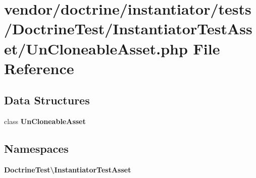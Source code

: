 \section{vendor/doctrine/instantiator/tests/\+Doctrine\+Test/\+Instantiator\+Test\+Asset/\+Un\+Cloneable\+Asset.php File Reference}
\label{_un_cloneable_asset_8php}
\subsection*{Data Structures}
\begin{DoxyCompactItemize}
\item 
class {\bf Un\+Cloneable\+Asset}
\end{DoxyCompactItemize}
\subsection*{Namespaces}
\begin{DoxyCompactItemize}
\item 
 {\bf Doctrine\+Test\textbackslash{}\+Instantiator\+Test\+Asset}
\end{DoxyCompactItemize}

